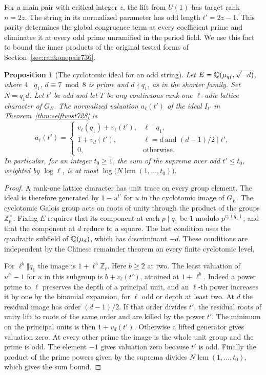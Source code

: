 \documentclass[a4paper,11pt]{article}
\newtheorem{proposition}{Proposition}[section]
\theoremstyle{definition}
\theoremstyle{remark}
\newcommand{\ZZ}{\mathbb Z}\newcommand{\ord}{\operatorname{ord}}
\numberwithin{equation}{section}
\begin{document}
For a main pair with critical integer \(z\), the lift from \(U(1)\)
has target rank \(n=2z\). The string in its normalized parameter
has odd length \(t'=2z-1\). This parity determines the global
congruence term at every coefficient prime and eliminates it at
every odd prime unramified in the period field. We use this fact
to bound the inner products of the original tested forms of
Section~\ref{sec:rankonepair736}.

\begin{proposition}[The cyclotomic ideal for an odd string]\leavevmode
\label{prop:oddcyclo737}
Let \(E=\mathbb Q(\mu_{q_1},\sqrt{-d})\), where \(4\mid q_1\),
\(d\equiv7\bmod 8\) is prime and \(d\nmid q_1\), as in the
shorter family. Set \(N=q_1d\). Let \(t'\) be odd and let
\(T\) be any continuous rank-one \(\ell\)-adic lattice character
of \(G_E\). The normalized valuation \(a_\ell(t')\) of the ideal
\(I_{t'}\) in Theorem~\ref{thm:selftwist728} is
\[
 a_\ell(t')=
 \begin{cases}
  v_\ell(q_1)+v_\ell(t'), &\ell\mid q_1,\\
  1+v_d(t'), &\ell=d\ \text{and }(d-1)/2\mid t',\\
  0,&\text{otherwise}.
 \end{cases}
\]
In particular, for an integer \(t_0\ge1\), the sum of the suprema
over odd \(t'\le t_0\), weighted by \(\log\ell\), is at most
\(\log\big(N\operatorname{lcm}(1,\ldots,t_0)\big)\).
\end{proposition}
\begin{proof}
A rank-one lattice character has unit trace on every group
element. The ideal is therefore generated by \(1-u^{t'}\) for
\(u\) in the cyclotomic image of \(G_E\). The cyclotomic Galois
group acts on roots of unity through the product of the groups
\(\ZZ_p^\times\). Fixing \(E\) requires that its component
at each \(p\mid q_1\) be \(1\) modulo \(p^{v_p(q_1)}\), and
that the component at \(d\) reduce to a square. The last
condition uses the quadratic subfield of \(\mathbb Q(\mu_d)\), which
has discriminant \(-d\). These conditions are independent by the
Chinese remainder theorem on every finite cyclotomic level.

For \(\ell^b\Vert q_1\) the image is \(1+\ell^b\ZZ_\ell\).
Here \(b\ge2\) at two. The least valuation of \(u^{t'}-1\)
for \(u\) in this subgroup is \(b+v_\ell(t')\), attained at
\(1+\ell^b\). Indeed a power prime to \(\ell\) preserves the
depth of a principal unit, and an \(\ell\)-th power increases
it by one by the binomial expansion, for \(\ell\) odd or depth
at least two. At \(d\) the residual image has order \((d-1)/2\).
If that order divides \(t'\), the residual roots of unity lift
to roots of the same order and are killed by the power \(t'\).
The minimum on the principal units is then \(1+v_d(t')\).
Otherwise a lifted generator gives valuation zero. At every
other prime the image is the whole unit group and the prime is
odd. The element \(-1\) gives valuation zero because \(t'\) is
odd. Finally the product of the prime powers given by the
suprema divides \(N\operatorname{lcm}(1,\ldots,t_0)\), which
gives the sum bound.
\end{proof}
\end{document}

